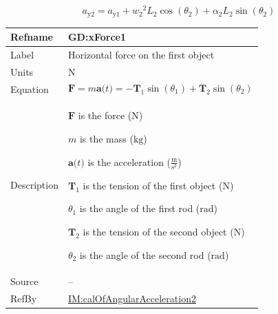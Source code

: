 \documentclass[12pt]{article}
\begin{document}
\begin{displaymath}
{a_{\text{y}2}}={a_{\text{y}1}}+{w_{2}}^{2} {L_{2}} \cos\left({θ_{2}}\right)+{α_{2}} {L_{2}} \sin\left({θ_{2}}\right)
\end{displaymath}
\vspace{\baselineskip}
\noindent
\begin{minipage}{\textwidth}
\begin{tabular}{>{\raggedright}p{}>{\raggedright\arraybackslash}p{}}
\toprule \textbf{Refname} & \textbf{GD:xForce1}
\label{GD:xForce1}
\\ \midrule
Label & Horizontal force on the first object
        
\\ \midrule
Units & ${\text{N}}$
        
\\ \midrule
Equation & \begin{displaymath}
           \symbf{F}=m \symbf{a}\text{(}t\text{)}=-{\symbf{T}_{1}} \sin\left({θ_{1}}\right)+{\symbf{T}_{2}} \sin\left({θ_{2}}\right)
           \end{displaymath}
\\ \midrule
Description & \begin{symbDescription}
              \item{$\symbf{F}$ is the force (${\text{N}}$)}
              \item{$m$ is the mass (${\text{kg}}$)}
              \item{$\symbf{a}\text{(}t\text{)}$ is the acceleration ($\frac{\text{m}}{\text{s}^{2}}$)}
              \item{${\symbf{T}_{1}}$ is the tension of the first object (${\text{N}}$)}
              \item{${θ_{1}}$ is the angle of the first rod (${\text{rad}}$)}
              \item{${\symbf{T}_{2}}$ is the tension of the second object (${\text{N}}$)}
              \item{${θ_{2}}$ is the angle of the second rod (${\text{rad}}$)}
              \end{symbDescription}
\\ \midrule
Source & --
         
\\ \midrule
RefBy & \hyperref[IM:calOfAngularAcceleration2]{IM:calOfAngularAcceleration2}
        
\\ \bottomrule
\end{tabular}
\end{minipage}
\end{document}
